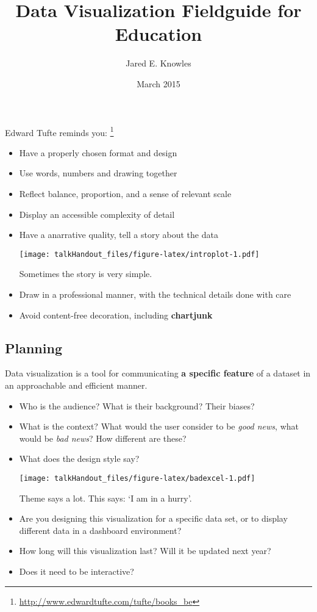 \documentclass{tufte-handout}
\title{Data Visualization Fieldguide for Education}
\author{Jared E. Knowles}
\date{March 2015}
\begin{document}
\maketitle



Edward Tufte reminds you: \footnote{\url{http://www.edwardtufte.com/tufte/books_be}}

\begin{itemize}
\itemsep1pt\parskip0pt
\item
  Have a properly chosen format and design
\item
  Use words, numbers and drawing together
\item
  Reflect balance, proportion, and a sense of relevant scale
\item
  Display an accessible complexity of detail
\item
  Have a anarrative quality, tell a story about the data

  \begin{marginfigure}
   \texttt{[image: talkHandout\_files/figure-latex/introplot-1.pdf]}
  \caption{Sometimes the story is very simple.}
  \end{marginfigure}
\item
  Draw in a professional manner, with the technical details done with
  care
\item
  Avoid content-free decoration, including \textbf{chartjunk}
\end{itemize}

\subsection{Planning}\label{planning}

Data visualization is a tool for communicating \textbf{a specific
feature} of a dataset in an approachable and efficient
manner.

\begin{itemize}
\itemsep1pt\parskip0pt
\item
  Who is the audience? What is their background? Their biases?
\item
  What is the context? What would the user consider to be \emph{good
  news}, what would be \emph{bad news}? How different are these?
\item
  What does the design style say?

  \begin{marginfigure}
   \texttt{[image: talkHandout\_files/figure-latex/badexcel-1.pdf]}
  \caption{Theme says a lot. This says: `I am in a hurry'.}
  \end{marginfigure}
\item
  Are you designing this visualization for a specific data set, or to
  display different data in a dashboard environment?
\item
  How long will this visualization last? Will it be updated next year?
\item
  Does it need to be interactive?
\end{itemize}
\end{document}
